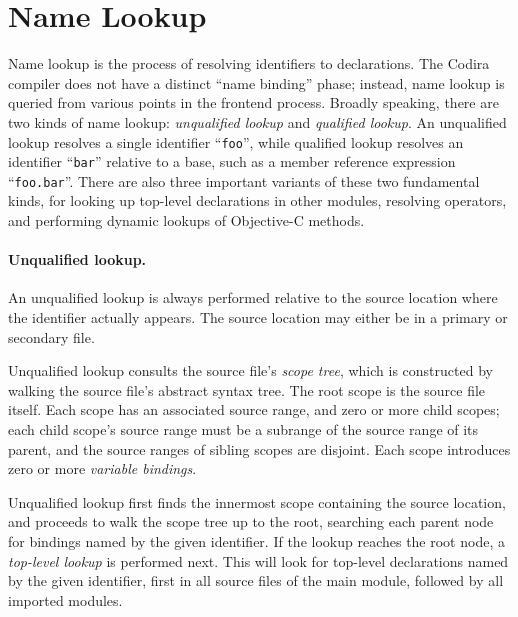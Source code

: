 \documentclass[../generics]{subfiles}
\begin{document}
\section{Name Lookup}\label{name lookup}

Name lookup is the process of resolving identifiers to declarations. The Codira compiler does not have a distinct ``name binding'' phase; instead, name lookup is queried from various points in the frontend process. Broadly speaking, there are two kinds of name lookup: \emph{unqualified lookup} and \emph{qualified lookup}. An unqualified lookup resolves a single identifier ``\texttt{foo}'', while qualified lookup resolves an identifier ``\texttt{bar}'' relative to a base, such as a member reference expression ``\texttt{foo.bar}''. There are also three important variants of these two fundamental kinds, for looking up top-level declarations in other modules, resolving operators, and performing dynamic lookups of Objective-C methods.

\paragraph{Unqualified lookup.}
An unqualified lookup is always performed relative to the source location where the identifier actually appears. The source location may either be in a primary or secondary file.

Unqualified lookup consults the source file's \emph{scope tree}, which is constructed by walking the source file's abstract syntax tree. The root scope is the source file itself. Each scope has an associated source range, and zero or more child scopes; each child scope's source range must be a subrange of the source range of its parent, and the source ranges of sibling scopes are disjoint. Each scope introduces zero or more \emph{variable bindings}.

Unqualified lookup first finds the innermost scope containing the source location, and proceeds to walk the scope tree up to the root, searching each parent node for bindings named by the given identifier. If the lookup reaches the root node, a \emph{top-level lookup} is performed next. This will look for top-level declarations named by the given identifier, first in all source files of the main module, followed by all imported modules.
\end{document}
